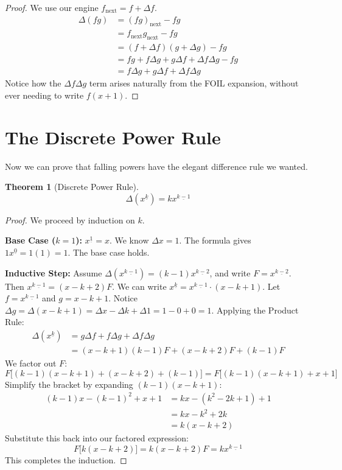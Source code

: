 \documentclass[12pt]{article}
\newtheorem{theorem}{Theorem}
\newcommand{\next}[1]{#1_{\text{next}}}
\newcommand{\falling}[2]{{#1}^{\underline{#2}}}
\begin{document}
\begin{proof}
We use our engine $\next{f} = f + \Delta f$.
\begin{align*}
    \Delta(fg) &= \next{(fg)} - fg \\
    &= \next{f}\next{g} - fg \\
    &= (f + \Delta f)(g + \Delta g) - fg \\
    &= fg + f\Delta g + g\Delta f + \Delta f \Delta g - fg \\
    &= f\Delta g + g\Delta f + \Delta f \Delta g
\end{align*}
Notice how the $\Delta f \Delta g$ term arises naturally from the FOIL expansion, without ever needing to write $f(x+1)$. 
\end{proof}

\section{The Discrete Power Rule}

Now we can prove that falling powers have the elegant difference rule we wanted.

\begin{theorem}[Discrete Power Rule]
\[ \Delta(\falling{x}{k}) = k \falling{x}{k-1} \]
\end{theorem}

\begin{proof}
We proceed by induction on $k$.

\textbf{Base Case ($k=1$):} 
$\falling{x}{1} = x$. We know $\Delta x = 1$. The formula gives $1 \falling{x}{0} = 1(1) = 1$. The base case holds.

\textbf{Inductive Step:} 
Assume $\Delta(\falling{x}{k-1}) = (k-1)\falling{x}{k-2}$, and write $F = \falling{x}{k-2}$. Then $\falling{x}{k-1} = (x-k+2)F$.
We can write $\falling{x}{k} = \falling{x}{k-1} \cdot (x - k + 1)$.
Let $f = \falling{x}{k-1}$ and $g = x - k + 1$.
Notice $\Delta g = \Delta(x - k + 1) = \Delta x - \Delta k + \Delta 1 = 1 - 0 + 0 = 1$.
Applying the Product Rule:
\begin{align*}
    \Delta(\falling{x}{k}) &= g \Delta f + f \Delta g + \Delta f \Delta g \\
    &= (x - k + 1)(k-1)F + (x-k+2)F + (k-1)F
\end{align*}
We factor out $F$:
\[ F \big[ (k-1)(x-k+1) + (x-k+2) + (k-1) \big] = F \big[ (k-1)(x-k+1) + x + 1 \big] \]
Simplify the bracket by expanding $(k-1)(x-k+1)$:
\begin{align*}
    (k-1)x - (k-1)^2 + x + 1 &= kx - (k^2 - 2k + 1) + 1 \\
    &= kx - k^2 + 2k \\
    &= k(x - k + 2)
\end{align*}
Substitute this back into our factored expression:
\[ F \big[ k(x - k + 2) \big] = k(x-k+2)F = k \falling{x}{k-1} \]
This completes the induction.
\end{proof}
\end{document}
